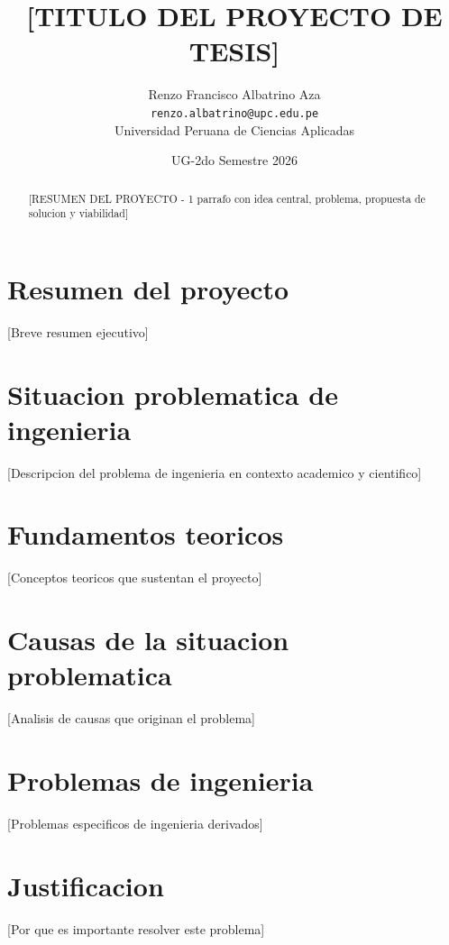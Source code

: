 \documentclass[12pt,a4paper]{article}
\title{[TITULO DEL PROYECTO DE TESIS]}
\author{Renzo Francisco Albatrino Aza \\
\texttt{renzo.albatrino@upc.edu.pe} \\
Universidad Peruana de Ciencias Aplicadas}
\date{UG-2do Semestre 2026}
\begin{document}
\maketitle

\begin{abstract}
[RESUMEN DEL PROYECTO - 1 parrafo con idea central, problema, propuesta de solucion y viabilidad]
\end{abstract}

\section{Resumen del proyecto}
[Breve resumen ejecutivo]

\section{Situacion problematica de ingenieria}
[Descripcion del problema de ingenieria en contexto academico y cientifico]

\section{Fundamentos teoricos}
[Conceptos teoricos que sustentan el proyecto]

\section{Causas de la situacion problematica}
[Analisis de causas que originan el problema]

\section{Problemas de ingenieria}
[Problemas especificos de ingenieria derivados]

\section{Justificacion}
[Por que es importante resolver este problema]
\end{document}
